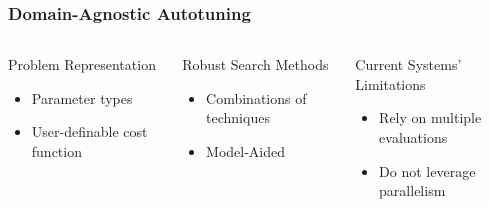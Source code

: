 \documentclass[10pt, compress, aspectratio=169]{beamer}
\begin{document}
\begin{frame}
    \frametitle{Domain-Agnostic Autotuning}
    \begin{columns}
        \begin{block}{Problem Representation}
            \begin{itemize}
                \item Parameter \alert{types}
                \item \alert{User-definable cost function}
            \end{itemize}
        \end{block}

        \pause

        \begin{block}{Robust Search Methods}
            \begin{itemize}
                \item \alert{Combinations} of techniques
                \item \alert{Model-Aided}
            \end{itemize}
        \end{block}

        \pause

        \begin{block}{Current Systems' Limitations}
            \begin{itemize}
                \item Rely on \alert{multiple evaluations}
                \item \alert{Do not leverage parallelism}
            \end{itemize}
        \end{block}

    \end{columns}
\end{frame}
\end{document}
